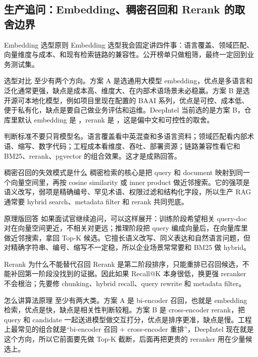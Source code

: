 \documentclass[12pt]{article}
\begin{document}
\subsection{生产追问：Embedding、稠密召回和 Rerank 的取舍边界}
\begin{qaBox}{Embedding 选型原则}
Embedding 选型我会固定讲四件事：语言覆盖、领域匹配、向量维度与成本、和现有检索链路的兼容性。公开榜单只做粗筛，最终一定回到业务测试集。
\end{qaBox}

\begin{analysisBox}{选型对比}
至少有两个方向。方案 A 是选通用大模型 embedding，优点是多语言和泛化通常更强，缺点是成本高、维度大、在内部术语场景未必稳赢。方案 B 是选开源可本地化模型，例如项目里现在配置的 BAAI 系列，优点是可控、成本低、便于私有化，缺点是要自己做业务评估和运维。DeepIntel 当前选的是方案 B，仓库里默认 embedding 是 ，rerank 是 ，这是偏中文和可控性的取舍。

判断标准不要只背模型名。语言覆盖看中英混查和多语言资料；领域匹配看内部术语、缩写、数字代码；工程成本看维度、吞吐、部署资源；链路兼容性看它和 BM25、rerank、pgvector 的组合效果。这才是成熟回答。
\end{analysisBox}

\begin{qaBox}{稠密召回的失效模式是什么}
稠密检索的核心是把 query 和 document 映射到同一个向量空间里，再按 cosine similarity 或 inner product 做近邻搜索。它的强项是语义改写，弱项是精确编号、罕见术语、权限过滤和结构化字段，所以生产 RAG 通常要 hybrid search、metadata filter 和 rerank 共同兜底。
\end{qaBox}

\begin{analysisBox}{原理版回答}
如果面试官继续追问，可以这样展开：训练阶段希望相关 query-doc 对在向量空间更近，不相关对更远；推理阶段把 query 编成向量后，在向量库里做近邻搜索，拿回 Top-K 候选。它擅长语义改写、同义表达和自然语言问题，但对精确字符串、编号、缩写不一定稳，所以企业场景常常要和 BM25 做 hybrid。
\end{analysisBox}

\begin{qaBox}{Rerank 为什么不能替代召回}
Rerank 是第二阶段排序，只能重排已召回候选，不能补回第一阶段没找到的证据。因此如果 Recall@K 本身很低，换更强 reranker 不会根治；先要修 chunking、hybrid recall、query rewrite 和 metadata filter。
\end{qaBox}

\begin{analysisBox}{怎么讲算法原理}
至少有两大类。方案 A 是 bi-encoder 召回，也就是 embedding 检索，优点是快，缺点是相关性判断较粗。方案 B 是 cross-encoder rerank，把 query 和 candidate 一起送进模型做交互打分，优点是排序更准，缺点是慢。工程上最常见的组合就是“bi-encoder 召回 + cross-encoder 重排”，DeepIntel 现在就是这个方向，所以它前面要先做 Top-K 截断，后面再把更贵的 reranker 用在少量候选上。
\end{analysisBox}
\end{document}
